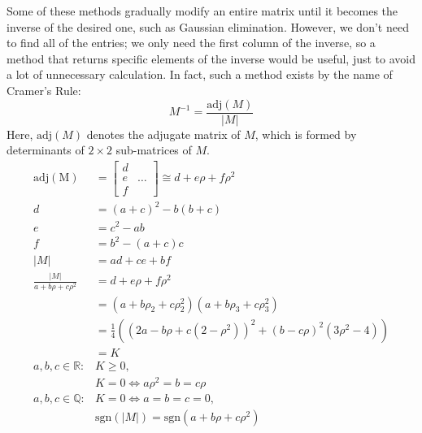 \documentclass{article}
\begin{document}
Some of these methods gradually modify an entire matrix
until it becomes the inverse of the desired one,
such as Gaussian elimination.
However, we don't need to find all of the entries;
we only need the first column of the inverse,
so a method that returns specific elements of the inverse would be useful,
just to avoid a lot of unnecessary calculation.
In fact, such a method exists by the name of Cramer's Rule:
\[M^{-1} = \frac{\mathrm{adj}(M)}{\lvert M \rvert}\]
Here, $\mathrm{adj}(M)$ denotes the adjugate matrix of $M$,
which is formed by determinants of $2 \times 2$ sub-matrices of $M$.
\begin{align*}
  \mathrm{adj(M)} &=
  \begin{bmatrix}
    d & \\
    e & \hdots \\
    f &
  \end{bmatrix}
  \cong d+e\rho+f\rho^2 \\
  d &=
  (a+c)^2-b(b+c) \\
  e &=
  c^2-ab \\
  f &=
  b^2-(a+c)c \\
  \lvert M \rvert &= ad+ce+bf \\
  \frac{\lvert M \rvert}{a+b\rho+c\rho^2}
  &= d+e\rho+f\rho^2 \\
  &= (a+b\rho_2+c\rho_2^2)(a+b\rho_3+c\rho_3^2) \\
  &= \frac{1}{4}\left((2a-b\rho+c(2-\rho^2))^2+(b-c\rho)^2(3\rho^2-4)\right) \\
  &= K \\
  a, b, c \in \mathbb{R}: & K \geq 0, \\
  & K = 0 \iff a\rho^2 = b = c\rho \\
  a, b, c \in \mathbb{Q}: & K = 0 \iff a = b = c = 0, \\
  & \mathrm{sgn}(\lvert M \rvert) = \mathrm{sgn}(a+b\rho+c\rho^2) \\
\end{align*}
\end{document}
